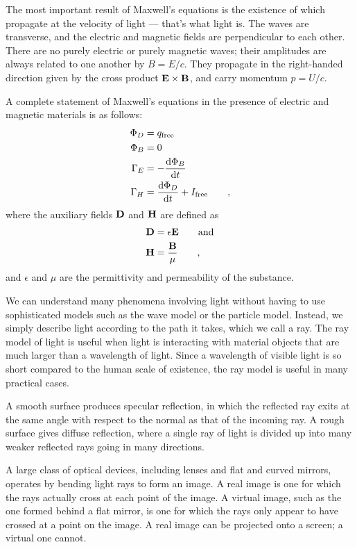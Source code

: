 	The most important result of Maxwell's equations is the existence of
	 which propagate at the velocity of light --- that's
	what light is. The waves are transverse, and the electric and magnetic fields
	are perpendicular to each other. There are no purely electric or purely magnetic
	waves; their amplitudes are always related to one another by $B=E/c$. They propagate
	in the right-handed direction given by the cross product $\mathbf{E}\times\mathbf{B}$, and
	carry momentum $p=U/c$.

A complete statement of Maxwell's equations in the presence of electric and magnetic materials is as follows:
\begin{align*}
    \Phi_D &= q_\text{free} \\
    \Phi_B &= 0 \\
    \Gamma_E &= -\frac{\operatorname{d\!} \Phi_B}{\operatorname{d\!} t} \\
    \Gamma_H &= \frac{\operatorname{d\!} \Phi_D}{\operatorname{d\!} t} + I_\text{free} \qquad ,
\end{align*}
where the auxiliary fields $\mathbf{D}$ and $\mathbf{H}$ are defined as
\begin{align*}
  \mathbf{D} &=\epsilon \mathbf{E} \qquad  \text{and}\\
  \mathbf{H} &= \frac{\mathbf{B}}{\mu} \qquad ,
\end{align*}
and $\epsilon$ and $\mu$ are the permittivity and permeability of the substance.
	
We can understand many phenomena involving light without
having to use sophisticated models such as the wave model or
the particle model. Instead, we simply describe light
according to the path it takes, which we call a ray. The ray
model of light is useful when light is interacting with
material objects that are much larger than a wavelength of
light. Since a wavelength of visible light is so short
compared to the human scale of existence, the ray model is
useful in many practical cases.

A smooth surface produces specular reflection, in which the
reflected ray exits at the same angle with respect to the
normal as that of the incoming ray. A rough surface gives
diffuse reflection, where a single ray of light is divided
up into many weaker reflected rays going in many directions.

A large class of optical devices, including lenses and flat
and curved mirrors, operates by bending light rays to form
an image. A real image is one for which the rays actually
cross at each point of the image. A virtual image, such as
the one formed behind a flat mirror, is one for which the
rays only appear to have crossed at a point on the image. A
real image can be projected onto a screen; a virtual one cannot.


